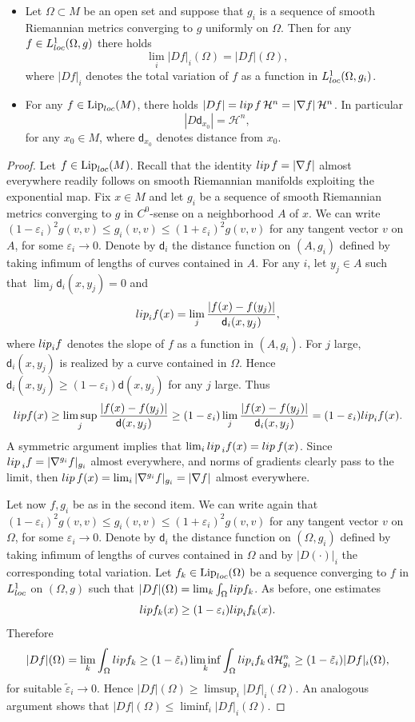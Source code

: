 \documentclass[a4paper,12pt,reqno]{amsart}
\numberwithin{equation}{section}
\theoremstyle{plain}
\theoremstyle{definition}
\theoremstyle{remark}
\newcommand{\lip}{{\rm lip \,}}
\newcommand{\eps}{\varepsilon}
\DeclareMathOperator{\Lip}{Lip}
\newcommand{\haus}{\mathcal{H}}
\newcommand{\dist}{\mathsf{d}}
\newcommand{\de}{\ensuremath{\,\mathrm d}} %
\begin{document}
{\begin{lemma}
\begin{itemize}
    \item Let $\Omega\subset M$ be an open set and suppose that $g_i$ is a sequence of smooth Riemannian metrics converging to $g$ uniformly on $\Omega$. Then for any $f \in L^1_{\rm loc}(\Omega, g)$ there holds
    \[
    \lim_i |D f|_i(\Omega) = |D f|(\Omega),
    \]
    where $|D f|_i$ denotes the total variation of $f$ as a function in $L^1_{\rm loc}(\Omega, g_i)$.

    \item For any $f \in \Lip_{\rm loc}(M)$, there holds $|D f|   =\lip f \,\haus^n = |\nabla f | \, \haus^n$. In particular
    \[
    |D \dist_{x_0} | = \haus^n,
    \]
    for any $x_0 \in M$, where $\dist_{x_0}$ denotes distance from $x_0$.
\end{itemize}
\end{lemma}

\begin{proof}
Let $f \in \Lip_{\rm loc}(M)$. Recall that the identity $\lip f = |\nabla f|$ almost everywhere readily follows on smooth Riemannian manifolds exploiting the exponential map. Fix $x \in M$ and let $g_i$ be a sequence of smooth Riemannian metrics converging to $g$ in $C^0$-sense on a neighborhood $A$ of $x$. We can write $(1-\eps_i)^2 g(v,v) \le g_i(v,v) \le (1+\eps_i)^2 g(v,v) $ for any tangent vector $v$ on $A$, for some $\eps_i\to0$. Denote by $\dist_i$ the distance function on $(A,g_i)$ defined by taking infimum of lengths of curves contained in $A$. For any $i$, let $y_j\in A$ such that $\lim_j\dist_i(x,y_j)=0$ and
\[
{\rm lip}_i f(x) = \lim_j \frac{|f(x)-f(y_j)|}{\dist_i(x,y_j)},
\]
where ${\rm lip}_i f$ denotes the slope of $f$ as a function in $(A, g_i)$.
For $j$ large, $\dist_i(x,y_j)$ is realized by a curve contained in $\Omega$. Hence $\dist_i(x,y_j) \ge (1-\eps_i) \dist(x,y_j)$ for any $j$ large. Thus 
\[
{\rm lip} f(x) \ge \limsup_j \frac{|f(x)-f(y_j)|}{\dist(x,y_j)} \ge  (1-\eps_i) \lim_j \frac{|f(x)-f(y_j)|}{\dist_i(x,y_j)} = (1-\eps_i) {\rm lip}_i f(x).
\]
A symmetric argument implies that $\lim_i \lip_i f(x) = \lip f(x)$. Since $\lip_i f= |\nabla^{g_i} f|_{g_i}$ almost everywhere, and norms of gradients clearly pass to the limit, then $\lip f(x) = \lim_i |\nabla^{g_i} f|_{g_i} = |\nabla f|$ almost everywhere.

Let now $f, g_i$ be as in the second item.
We can write again that $(1-\eps_i)^2 g(v,v) \le g_i(v,v) \le (1+\eps_i)^2 g(v,v) $ for any tangent vector $v$ on $\Omega$, for some $\eps_i\to0$. 
Denote by $\dist_i$ the distance function on $(\Omega,g_i)$ defined by taking infimum of lengths of curves contained in $\Omega$ and by $|D (\cdot)|_i$ the corresponding total variation.
Let $f_k\in \Lip_{\rm loc}(\Omega)$ be a sequence converging to $f$ in $L^1_{\rm loc}$ on $(\Omega,g)$ such that $|D f|(\Omega) = \lim_k \int_\Omega {\rm lip} f_k$.
As before, one estimates
\[
{\rm lip} f_k(x) \ge (1-\eps_i) {\rm lip}_i f_k(x).
\]
Therefore
\[
|D f|(\Omega) = \lim_k \int_\Omega {\rm lip} f_k  \ge (1-\tilde\eps_i) \liminf_k \int_\Omega {\rm lip}_i f_k \de \haus^n_{g_i} \ge (1-\tilde\eps_i)  |D f|_i(\Omega),
\]
for suitable $\tilde\eps_i\to 0$. Hence $|D f|(\Omega) \ge \limsup_i |D f|_i(\Omega)$. An analogous argument shows that $|D f|(\Omega) \le \liminf_i |D f|_i(\Omega)$.


\end{proof}}
\end{document}
